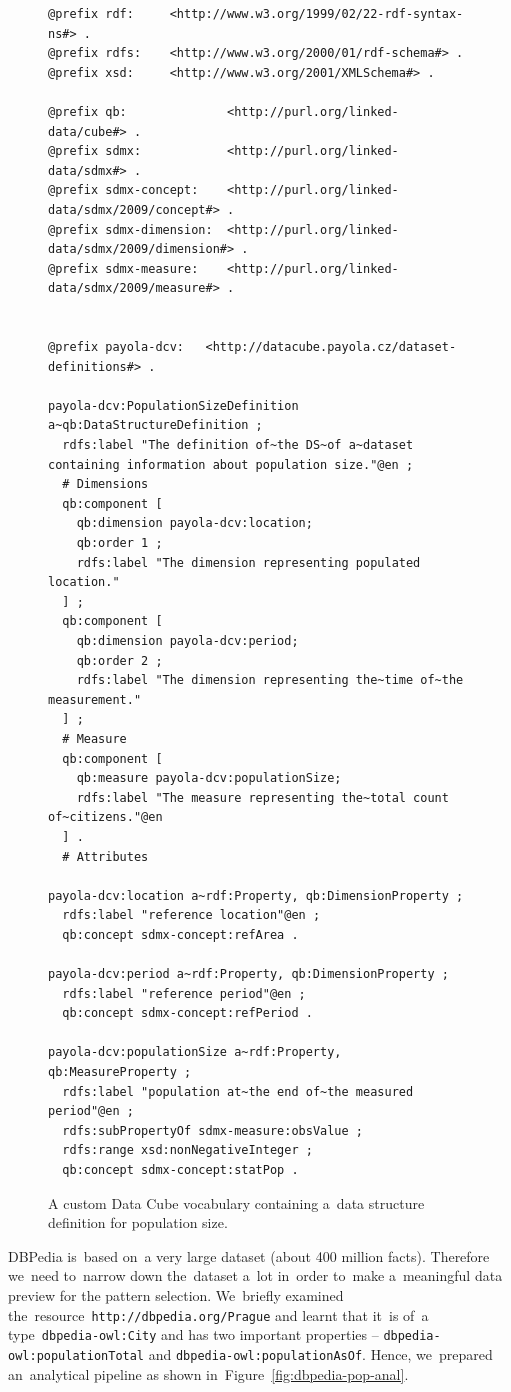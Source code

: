 \begin{figure}
  \scriptsize
  \begin{verbatim}
@prefix rdf:     <http://www.w3.org/1999/02/22-rdf-syntax-ns#> .
@prefix rdfs:    <http://www.w3.org/2000/01/rdf-schema#> .
@prefix xsd:     <http://www.w3.org/2001/XMLSchema#> .

@prefix qb:              <http://purl.org/linked-data/cube#> .
@prefix sdmx:            <http://purl.org/linked-data/sdmx#> .
@prefix sdmx-concept:    <http://purl.org/linked-data/sdmx/2009/concept#> .
@prefix sdmx-dimension:  <http://purl.org/linked-data/sdmx/2009/dimension#> .
@prefix sdmx-measure:    <http://purl.org/linked-data/sdmx/2009/measure#> .


@prefix payola-dcv:   <http://datacube.payola.cz/dataset-definitions#> .

payola-dcv:PopulationSizeDefinition a~qb:DataStructureDefinition ;
  rdfs:label "The definition of~the DS~of a~dataset containing information about population size."@en ;
  # Dimensions
  qb:component [
    qb:dimension payola-dcv:location;
    qb:order 1 ;
    rdfs:label "The dimension representing populated location."
  ] ;
  qb:component [	
    qb:dimension payola-dcv:period;
    qb:order 2 ;
    rdfs:label "The dimension representing the~time of~the measurement."
  ] ;
  # Measure
  qb:component [
    qb:measure payola-dcv:populationSize;
    rdfs:label "The measure representing the~total count of~citizens."@en
  ] .
  # Attributes

payola-dcv:location a~rdf:Property, qb:DimensionProperty ;
  rdfs:label "reference location"@en ;
  qb:concept sdmx-concept:refArea .

payola-dcv:period a~rdf:Property, qb:DimensionProperty ;
  rdfs:label "reference period"@en ;
  qb:concept sdmx-concept:refPeriod .

payola-dcv:populationSize a~rdf:Property, qb:MeasureProperty ;
  rdfs:label "population at~the end of~the measured period"@en ;
  rdfs:subPropertyOf sdmx-measure:obsValue ;
  rdfs:range xsd:nonNegativeInteger ;
  qb:concept sdmx-concept:statPop .
  \end{verbatim}
  \caption{A custom Data Cube vocabulary containing a~data structure definition for population size.}
  \label{fig:dcv-dbpedia-dsd}
\end{figure}

\begin{sloppypar}
DBPedia is~based on~a very large dataset (about 400 million facts). Therefore we~need to~narrow down the~dataset a~lot in~order to~make a~meaningful data preview for 
the
pattern selection. We~briefly examined the~resource~\texttt{http://dbpedia.org/Prague} 
and learnt that it~is of~a type~\texttt{dbpedia-owl:City} and has two 
important properties -- \texttt{dbpedia-owl:populationTotal} and 
\texttt{dbpedia-owl:populationAsOf}. Hence, we~prepared an~analytical pipeline 
as shown in~Figure~\ref{fig:dbpedia-pop-anal}.
\end{sloppypar}

